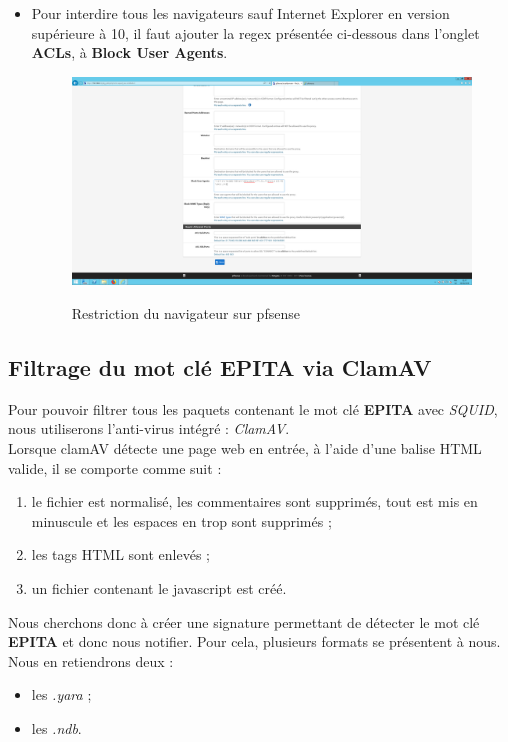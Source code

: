 \begin{itemize}
\item Pour interdire tous les navigateurs sauf Internet Explorer en version supérieure à 10, il faut ajouter la regex présentée ci-dessous dans l'onglet \textbf{ACLs}, à \textbf{Block User Agents}.
\begin{figure}[h!]
    \begin{center}
        \includegraphics[scale=0.20]{Pfsense_Screeshots/interception/19.png}
        \label{Pfsense_Screeshots/interception/19}
        \caption{Restriction du navigateur sur pfsense}
    \end{center}
\end{figure}
\FloatBarrier 
\end{itemize}
\newpage

\subsection{Filtrage du mot clé EPITA via ClamAV}

Pour pouvoir filtrer tous les paquets contenant le mot clé \textbf{EPITA} avec \textit{SQUID}, nous utiliserons l'anti-virus intégré : \textit{ClamAV}. \\

Lorsque clamAV détecte une page web en entrée, à l'aide d'une balise HTML valide, il se comporte comme suit \cite{Clamav-signatures} :
\begin{enumerate}
    \item le fichier est normalisé, les commentaires sont supprimés, tout est mis en minuscule et les espaces en trop sont supprimés ;
    \item les tags HTML sont enlevés ;
    \item un fichier contenant le javascript est créé.
\end{enumerate}

Nous cherchons donc à créer une signature permettant de détecter le mot clé \textbf{EPITA} et donc nous notifier.
Pour cela, plusieurs formats se présentent à nous. Nous en retiendrons deux :
\begin{itemize}
    \item les \textit{.yara} \cite{yara-signatures} \cite{yara-hunting-signatures};
    \item les \textit{.ndb}\cite{ndb-signatures}.
\end{itemize}


